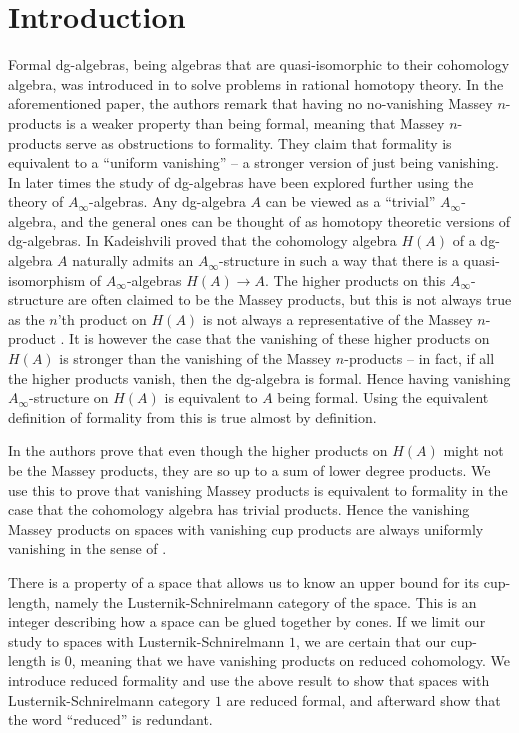 
\section{Introduction}

Formal dg-algebras, being algebras that are quasi-isomorphic to their cohomology 
algebra, was introduced in \cite{DGMS} to solve problems in rational homotopy theory. In 
the aforementioned paper, the authors remark that having no no-vanishing Massey 
$n$-products is a weaker property than being formal, meaning that Massey $n$-products 
serve as obstructions to formality. They claim that formality is equivalent to a 
``uniform vanishing'' – a stronger version of just being vanishing. In later times 
the study of dg-algebras have been explored further using the theory of 
$A_\infty$-algebras. Any dg-algebra $A$ can be viewed as a ``trivial'' 
$A_\infty$-algebra, and the general ones can be thought of as homotopy theoretic 
versions of dg-algebras. In \cite{kadeishvili} Kadeishvili proved that the cohomology 
algebra $H(A)$ of a dg-algebra $A$ naturally admits an $A_\infty$-structure in such 
a way that there is a quasi-isomorphism of $A_\infty$-algebras $H(A)\longrightarrow A$. 
The higher products on this $A_\infty$-structure are often claimed to be the Massey 
products, but this is not always true as the $n$'th product on $H(A)$ is not always 
a representative of the Massey $n$-product \cite{detection}. It is however the case that 
the vanishing of these higher products on $H(A)$ is stronger than the vanishing of 
the Massey $n$-products \cite{AHO} – in fact, if all the higher products vanish, then 
the dg-algebra is formal. Hence having vanishing $A_\infty$-structure on $H(A)$ is 
equivalent to $A$ being formal. Using the equivalent definition of formality from 
\cite{keller} this is true almost by definition. 

In \cite{detection} the authors prove that even though the higher products on $H(A)$ might 
not be the Massey products, they are so up to a sum of lower degree products. We use 
this to prove that vanishing Massey products is equivalent to formality in the case 
that the cohomology algebra has trivial products. Hence the vanishing Massey products 
on spaces with vanishing cup products are always uniformly vanishing in the sense of 
\cite{DGMS}. 

There is a property of a space that allows us to know an upper bound for its 
cup-length, namely the Lusternik-Schnirelmann category of the space. This is an 
integer describing how a space can be glued together by cones. If we limit our study 
to spaces with Lusternik-Schnirelmann $1$, we are certain that our cup-length is $0$, 
meaning that we have vanishing products on reduced cohomology. We introduce reduced 
formality and use the above result to show that spaces with Lusternik-Schnirelmann 
category $1$ are reduced formal, and afterward show that the word ``reduced'' is 
redundant.
